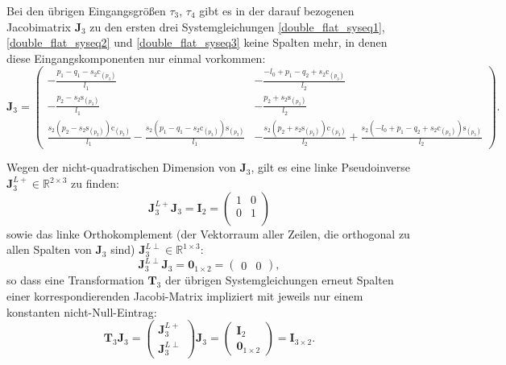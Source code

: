 Bei den übrigen Eingangsgrößen $\tau_3$, $\tau_4$ gibt es in der darauf bezogenen Jacobimatrix $\mathbf{J}_3$ zu den ersten drei Systemgleichungen  \eqref{double_flat_syseq1}, \eqref{double_flat_syseq2} und \eqref{double_flat_syseq3} keine Spalten mehr, in denen diese Eingangskomponenten nur einmal vorkommen:
\begin{equation*}
	\mathbf{J}_3 =
	\left(\begin{smallmatrix}
	- \frac{p_{1} - q_{1} - s_{2} \mathrm{c}_{\left(p_{3} \right)}}{l_{1}} & - \frac{- l_{0} + p_{1} - q_{2} + s_{2} \mathrm{c}_{\left(p_{3} \right)}}{l_{2}}\\
	- \frac{p_{2} - s_{2} \mathrm{s}_{\left(p_{3} \right)}}{l_{1}} & - \frac{p_{2} + s_{2} \mathrm{s}_{\left(p_{3} \right)}}{l_{2}}\\
	\frac{s_{2} \left(p_{2} - s_{2} \mathrm{s}_{\left(p_{3} \right)}\right) \mathrm{c}_{\left(p_{3} \right)}}{l_{1}} - \frac{s_{2} \left(p_{1} - q_{1} - s_{2} \mathrm{c}_{\left(p_{3} \right)}\right) \mathrm{s}_{\left(p_{3} \right)}}{l_{1}} & - \frac{s_{2} \left(p_{2} + s_{2} \mathrm{s}_{\left(p_{3} \right)}\right) \mathrm{c}_{\left(p_{3} \right)}}{l_{2}} + \frac{s_{2} \left(- l_{0} + p_{1} - q_{2} + s_{2} \mathrm{c}_{\left(p_{3} \right)}\right) \mathrm{s}_{\left(p_{3} \right)}}{l_{2}}
	\end{smallmatrix}\right).
\end{equation*}

Wegen der nicht-quadratischen Dimension von $\mathbf{J}_3$, gilt es eine linke Pseudoinverse $\mathbf{J}_3^{L+} \in \mathbb{R}^{2 \times 3}$ zu finden:
\begin{equation}
	\mathbf{J}_3^{L+} \mathbf{J}_3 = \mathbf{I}_{2} = 
	\left(\begin{matrix}
	1 & 0\\
	0 & 1\\
	\end{matrix}\right)	
\end{equation}
sowie das linke Orthokomplement (der Vektorraum aller Zeilen, die orthogonal zu allen Spalten von $\mathbf{J}_3$ sind) $\mathbf{J}_3^{L\perp} \in \mathbb{R}^{1 \times 3}$:
\begin{equation}
	\mathbf{J}_3^{L\perp} \mathbf{J}_3 = \mathbf{0}_{1 \times 2} = 
	\left(\begin{matrix}
	0 & 0
	\end{matrix}\right),
\end{equation}
so dass eine Transformation $\mathbf{T}_3$ der übrigen Systemgleichungen erneut Spalten einer korrespondierenden Jacobi-Matrix impliziert mit jeweils nur einem konstanten nicht-Null-Eintrag:
\begin{equation}
	\mathbf{T}_3 \mathbf{J}_3 =
	\left(\begin{matrix}
		\mathbf{J}_3^{L+} \\
		\mathbf{J}_3^{L \perp}
	\end{matrix}\right)
	\mathbf{J}_3 =
	\left(\begin{matrix}
		\mathbf{I}_{2} \\
		\mathbf{0}_{1 \times 2}
	\end{matrix}\right)
	=
	\mathbf{I}_{3 \times 2}. 
\end{equation}

